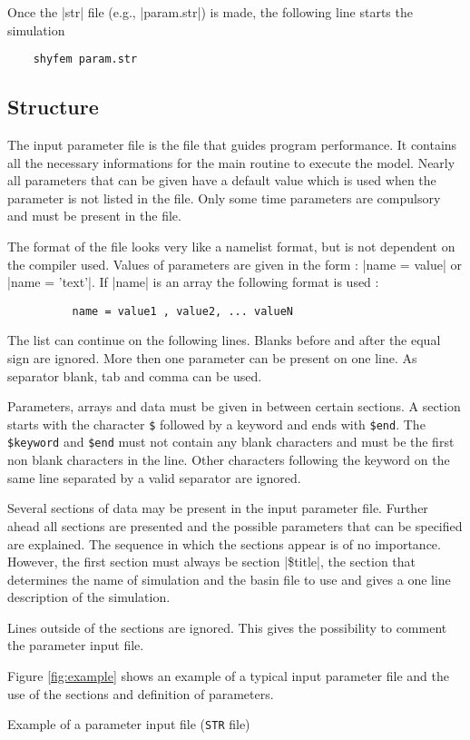 
Once the |str| file (e.g., |param.str|) is made, the following line
starts the simulation
\begin{verbatim}
	shyfem param.str
\end{verbatim}

\subsection{Structure}

The input parameter file is the file that guides program performance. It
contains all the necessary informations for the main routine to execute
the model. Nearly all parameters that can be given have a default value
which is used when the parameter is not listed in the file. Only some
time parameters are compulsory and must be present in the file.

The format of the file looks very like a namelist format, but is
not dependent on the compiler used. Values of parameters are given
in the form :  
|name = value|  or  |name = 'text'|.  If |name|
is an array the following format is used : 
\begin{verbatim}
          name = value1 , value2, ... valueN
\end{verbatim}
The list can continue on the following lines. Blanks before and after
the equal sign are ignored. More then one parameter can be present
on one line. As separator blank, tab and comma can be used.

Parameters, arrays and data must be given in between certain sections.
A section starts with the character {\tt \$} followed by a keyword and
ends with {\tt \$end}. The {\tt \$keyword} and {\tt \$end} must not
contain any blank characters and must be the first non blank characters
in the line. Other characters following the keyword on the same line
separated by a valid separator are ignored.

Several sections of data may be present in the input parameter file.
Further ahead all sections are presented and the possible
parameters that can be specified are explained. The sequence in
which the sections appear is of no importance. However, the first 
section must always be section |\$title|, the section that
determines the name of simulation and the basin file to use and
gives a one line description of the simulation.

Lines outside of the sections are ignored. This gives
the possibility to comment the parameter input file.

Figure \ref{fig:example} shows an example of a typical input
parameter file and the use of the sections and definition of
parameters.

{Example of a parameter input file ({\tt STR} file)}

